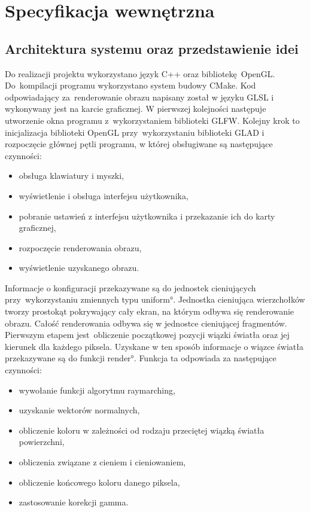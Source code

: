 \chapter{Specyfikacja wewnętrzna}
\label{ch:05}

\section{Architektura systemu oraz przedstawienie idei}
Do realizacji projektu wykorzystano język C++ oraz bibliotekę OpenGL. Do~kompilacji programu wykorzystano system budowy CMake. Kod odpowiadający za~renderowanie obrazu napisany został w języku GLSL i wykonywany jest na karcie graficznej.
W pierwszej kolejności następuje utworzenie okna programu z~wykorzystaniem biblioteki GLFW. Kolejny krok to inicjalizacja biblioteki OpenGL przy~wykorzystaniu biblioteki GLAD i rozpoczęcie głównej pętli programu, w której obsługiwane są następujące czynności:
\begin{itemize}
\item obsługa klawiatury i myszki,
\item wyświetlenie i obsługa interfejsu użytkownika,
\item pobranie ustawień z interfejsu użytkownika i przekazanie ich do karty graficznej,
\item rozpoczęcie renderowania obrazu,
\item wyświetlenie uzyskanego obrazu.
\end{itemize}

Informacje o konfiguracji przekazywane są do jednostek cieniujących przy~wykorzystaniu zmiennych typu \ang{uniform}. Jednostka cieniująca wierzchołków tworzy prostokąt pokrywający cały ekran, na którym odbywa się renderowanie obrazu. Całość renderowania odbywa się w jednostce cieniującej fragmentów. Pierwszym etapem jest~obliczenie początkowej pozycji wiązki światła oraz jej kierunek dla każdego piksela. Uzyskane w ten sposób informacje o wiązce światła przekazywane są do funkcji \ang{render}. Funkcja ta odpowiada za następujące czynności:
\begin{itemize}
\item wywołanie funkcji algorytmu raymarching,
\item uzyskanie wektorów normalnych,
\item obliczenie koloru w zależności od rodzaju przeciętej wiązką światła powierzchni,
\item obliczenia związane z cieniem i cieniowaniem,
\item obliczenie końcowego koloru danego piksela,
\item zastosowanie korekcji gamma.
\end{itemize}

